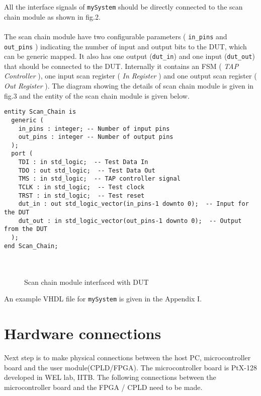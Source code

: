 \documentclass[a4paper,11pt]{article}
\begin{document}
All the interface signals of \texttt{mySystem} should be directly connected to the scan chain module as shown in fig.2. 
\paragraph*{}

The scan chain module have two configurable parameters ( \texttt{in\_pins} and \texttt{out\_pins} ) indicating the number of input and output bits to the DUT, which can be generic mapped. It also has one output (\texttt{dut\_in}) and one input (\texttt{dut\_out}) that should be connected to the DUT. Internally it contains an FSM ( \textit{TAP Controller} ), one input scan register ( \textit{In Register} ) and one output scan register ( \textit{Out Register} ). The diagram showing the details of scan chain module is given in fig.3 and the entity of the scan chain module is given below.

\begin{verbatim}
entity Scan_Chain is
  generic (
    in_pins : integer; -- Number of input pins
    out_pins : integer -- Number of output pins
  );
  port (
    TDI : in std_logic;  -- Test Data In
    TDO : out std_logic;  -- Test Data Out
    TMS : in std_logic;  -- TAP controller signal
    TCLK : in std_logic;  -- Test clock
    TRST : in std_logic;  -- Test reset
    dut_in : out std_logic_vector(in_pins-1 downto 0);  -- Input for the DUT
    dut_out : in std_logic_vector(out_pins-1 downto 0);  -- Output from the DUT
  );
end Scan_Chain;
\end{verbatim}

\paragraph*{}

\begin{figure}[h!]
\centering
\\
\caption{Scan chain module interfaced with DUT}
\end{figure}
An example VHDL file for \texttt{mySystem} is given in the Appendix I.


\section{Hardware connections}
Next step is to make physical connections between the host PC, microcontroller board and the user module(CPLD/FPGA). The microcontroller board is PtX-128 developed in WEL lab, IITB. The following connections between the microcontroller board and the FPGA / CPLD need to be made.
\end{document}

